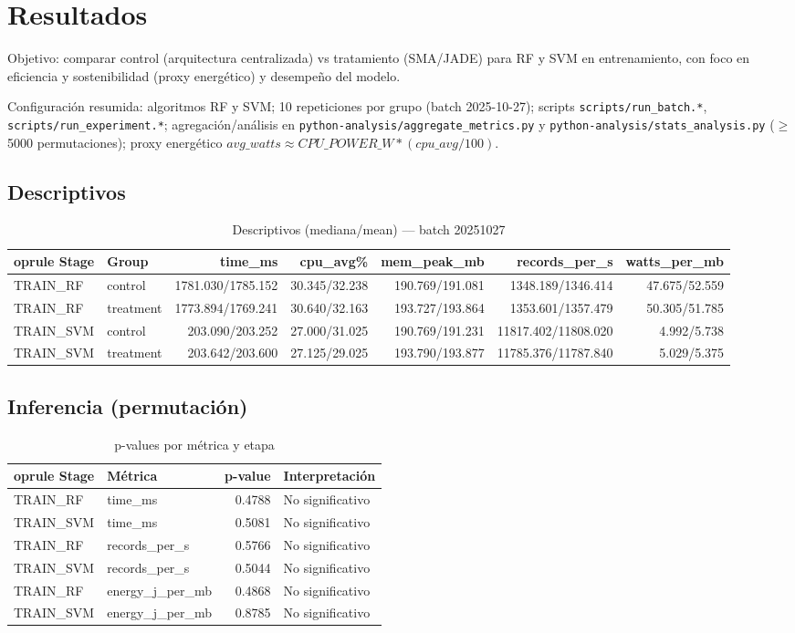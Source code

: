 \documentclass[12pt,twoside]{report}
\begin{document}
\chapter{Resultados}
Objetivo: comparar control (arquitectura centralizada) vs tratamiento (SMA/JADE) para RF y SVM en entrenamiento, con foco en eficiencia y sostenibilidad (proxy energético) y desempeño del modelo.

Configuración resumida: algoritmos RF y SVM; 10 repeticiones por grupo (batch 2025-10-27); scripts \texttt{scripts/run\_batch.*}, \texttt{scripts/run\_experiment.*}; agregación/análisis en \texttt{python-analysis/aggregate\_metrics.py} y \texttt{python-analysis/stats\_analysis.py} (\(\ge\) 5000 permutaciones); proxy energético \(avg\_watts \approx CPU\_POWER\_W * (cpu\_avg/100)\).

\section{Descriptivos}
\begin{table}[htbp]
\centering
\caption{Descriptivos (mediana/mean) — batch 20251027}
\begin{tabular}{l l r r r r r}
	oprule
Stage & Group & time\_ms & cpu\_avg\% & mem\_peak\_mb & records\_per\_s & watts\_per\_mb \\
\midrule
TRAIN\_RF & control & 1781.030/1785.152 & 30.345/32.238 & 190.769/191.081 & 1348.189/1346.414 & 47.675/52.559 \\
TRAIN\_RF & treatment & 1773.894/1769.241 & 30.640/32.163 & 193.727/193.864 & 1353.601/1357.479 & 50.305/51.785 \\
TRAIN\_SVM & control & 203.090/203.252 & 27.000/31.025 & 190.769/191.231 & 11817.402/11808.020 & 4.992/5.738 \\
TRAIN\_SVM & treatment & 203.642/203.600 & 27.125/29.025 & 193.790/193.877 & 11785.376/11787.840 & 5.029/5.375 \\
\bottomrule
\end{tabular}
\end{table}

\section{Inferencia (permutación)}
\begin{table}[htbp]
\centering
\caption{p-values por métrica y etapa}
\begin{tabular}{l l r l}
	oprule
Stage & Métrica & p-value & Interpretación \\
\midrule
TRAIN\_RF & time\_ms & 0.4788 & No significativo \\
TRAIN\_SVM & time\_ms & 0.5081 & No significativo \\
TRAIN\_RF & records\_per\_s & 0.5766 & No significativo \\
TRAIN\_SVM & records\_per\_s & 0.5044 & No significativo \\
TRAIN\_RF & energy\_j\_per\_mb & 0.4868 & No significativo \\
TRAIN\_SVM & energy\_j\_per\_mb & 0.8785 & No significativo \\
\bottomrule
\end{tabular}
\end{table}
\end{document}
